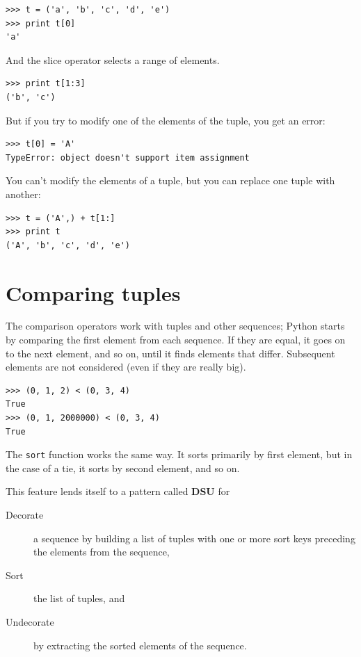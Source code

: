 \documentclass[10pt]{book}
\begin{document}
\beforeverb
\begin{verbatim}
>>> t = ('a', 'b', 'c', 'd', 'e')
>>> print t[0]
'a'
\end{verbatim}
\afterverb
%
And the slice operator selects a range of elements.


\beforeverb
\begin{verbatim}
>>> print t[1:3]
('b', 'c')
\end{verbatim}
\afterverb
%
But if you try to modify one of the elements of the tuple, you get
an error:


\beforeverb
\begin{verbatim}
>>> t[0] = 'A'
TypeError: object doesn't support item assignment
\end{verbatim}
\afterverb
%
You can't modify the elements of a tuple, but you can replace
one tuple with another:

\beforeverb
\begin{verbatim}
>>> t = ('A',) + t[1:]
>>> print t
('A', 'b', 'c', 'd', 'e')
\end{verbatim}
\afterverb
%

\section{Comparing tuples}


The comparison operators work with tuples and other sequences;
Python starts by comparing the first element from each
sequence.  If they are equal, it goes on to the next element,
and so on, until it finds elements that differ.  Subsequent
elements are not considered (even if they are really big).

\beforeverb
\begin{verbatim}
>>> (0, 1, 2) < (0, 3, 4)
True
>>> (0, 1, 2000000) < (0, 3, 4)
True
\end{verbatim}
\afterverb
%
The {\tt sort} function works the same way.  It sorts 
primarily by first element, but in the case of a tie, it sorts
by second element, and so on.  

This feature lends itself to a pattern called {\bf DSU} for 

\begin{description}

\item[Decorate] a sequence by building a list of tuples
with one or more sort keys preceding the elements from the sequence,

\item[Sort] the list of tuples, and

\item[Undecorate] by extracting the sorted elements of the sequence.

\end{description}
\end{document}
